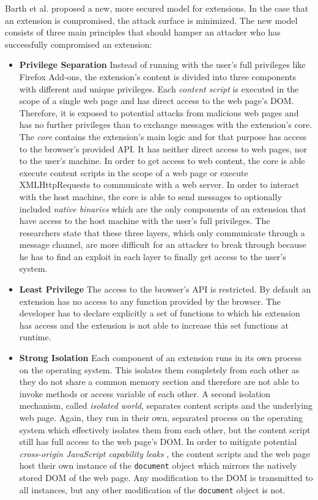 	Barth et al. proposed a new, more secured model for extensions. In the case that an extension is compromised, the attack surface is minimized. The new model consists of three main principles that should hamper an attacker who has successfully compromised an extension: 
	
	\begin{itemize}
		\item \textbf{Privilege Separation} Instead of running with the user's full privileges like Firefox Add-ons, the extension's content is divided into three components with different and unique privileges. Each \textit{content script} is executed in the scope of a single web page and has direct access to the web page's DOM. Therefore, it is exposed to potential attacks from malicious web pages and has no further privileges than to exchange messages with the extension's core. The \textit{core} contains the extension's main logic and for that purpose has access to the browser's provided API. It has neither direct access to web pages, nor to the user's machine. In order to get access to web content, the core is able execute content scripts in the scope of a web page or execute XMLHttpRequests to communicate with a web server. In order to interact with the host machine, the core is able to send messages to optionally included \textit{native binaries} which are the only components of an extension that have access to the host machine with the user's full privileges. The researchers state that these three layers, which only communicate through a message channel, are more difficult for an attacker to break through because he has to find an exploit in each layer to finally get access to the user's system.
		
		\item \textbf{Least Privilege} The access to the browser's API is restricted. By default an extension has no access to any function provided by the browser. The developer has to declare explicitly a set of functions to which his extension has access and the extension is not able to increase this set functions at runtime.
		
		\item \textbf{Strong Isolation} Each component of an extension runs in its own process on the operating system. This isolates them completely from each other as they do not share a common memory section and therefore are not able to invoke methods or access variable of each other. A second isolation mechanism, called \textit{isolated world}, separates content scripts and the underlying web page. Again, they run in their own, separated process on the operating system which effectively isolates them from each other, but the content script still has full access to the web page's DOM. In order to mitigate potential \textit{cross-origin JavaScript capability leaks} \cite{Barth:2009:CJC:1855768.1855780}, the content scripts and the web page host their own instance of the \texttt{document} object which mirrors the natively stored DOM of the web page. Any modification to the DOM is transmitted to all instances, but any other modification of the \texttt{document} object is not. 
	\end{itemize}
	
